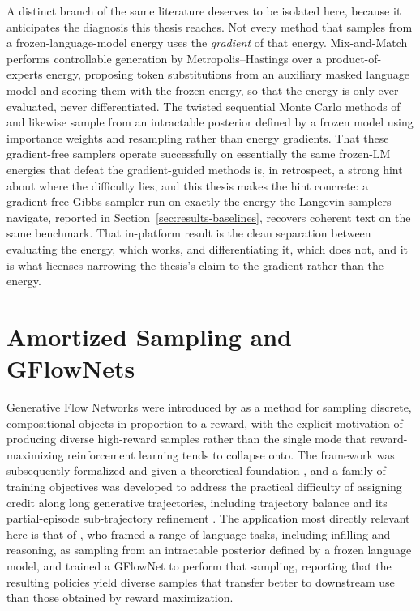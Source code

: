 A distinct branch of the same literature deserves to be isolated here, because it anticipates the diagnosis this thesis reaches. Not every method that samples from a frozen-language-model energy uses the \emph{gradient} of that energy. Mix-and-Match \citep{mireshghallah2022mixmatch} performs controllable generation by Metropolis--Hastings over a product-of-experts energy, proposing token substitutions from an auxiliary masked language model and scoring them with the frozen energy, so that the energy is only ever evaluated, never differentiated. The twisted sequential Monte Carlo methods of \citet{lew2023sequential} and \citet{zhao2024probabilistic} likewise sample from an intractable posterior defined by a frozen model using importance weights and resampling rather than energy gradients. That these gradient-free samplers operate successfully on essentially the same frozen-LM energies that defeat the gradient-guided methods is, in retrospect, a strong hint about where the difficulty lies, and this thesis makes the hint concrete: a gradient-free Gibbs sampler run on exactly the energy the Langevin samplers navigate, reported in Section~\ref{sec:results-baselines}, recovers coherent text on the same benchmark. That in-platform result is the clean separation between evaluating the energy, which works, and differentiating it, which does not, and it is what licenses narrowing the thesis's claim to the gradient rather than the energy.

\section{Amortized Sampling and GFlowNets}
\label{sec:rel-gflownet}

Generative Flow Networks were introduced by \citet{bengio2021flow} as a method for sampling discrete, compositional objects in proportion to a reward, with the explicit motivation of producing diverse high-reward samples rather than the single mode that reward-maximizing reinforcement learning tends to collapse onto. The framework was subsequently formalized and given a theoretical foundation \citep{bengio2023gflownet}, and a family of training objectives was developed to address the practical difficulty of assigning credit along long generative trajectories, including trajectory balance \citep{malkin2022trajectory} and its partial-episode sub-trajectory refinement \citep{madan2023learning}. The application most directly relevant here is that of \citet{hu2024amortizing}, who framed a range of language tasks, including infilling and reasoning, as sampling from an intractable posterior defined by a frozen language model, and trained a GFlowNet to perform that sampling, reporting that the resulting policies yield diverse samples that transfer better to downstream use than those obtained by reward maximization.

